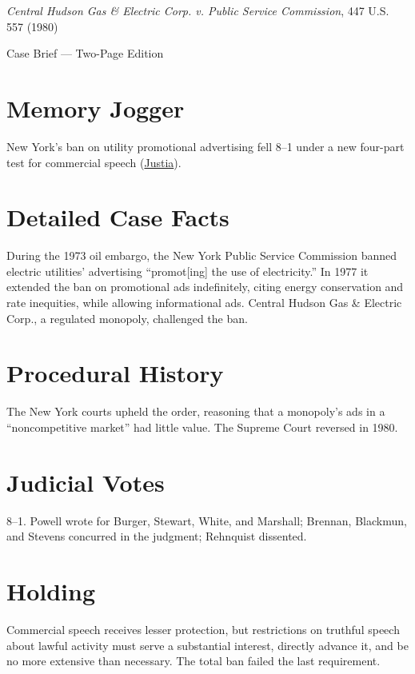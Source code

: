 \documentclass[12pt]{article}
\begin{document}
\begin{center}
{\LARGE \textit{Central Hudson Gas \& Electric Corp. v. Public Service Commission}, 447 U.S. 557 (1980)\par}
\vspace{0.5em}
{\large Case Brief --- Two-Page Edition\par}
\end{center}

\section{Memory Jogger}
New York's ban on utility promotional advertising fell 8--1 under a new four-part test for commercial speech (\href{https://supreme.justia.com/cases/federal/us/447/557/}{Justia}).

\section{Detailed Case Facts}
During the 1973 oil embargo, the New York Public Service Commission banned electric utilities' advertising ``promot[ing] the use of electricity.'' In 1977 it extended the ban on promotional ads indefinitely, citing energy conservation and rate inequities, while allowing informational ads. Central Hudson Gas \& Electric Corp., a regulated monopoly, challenged the ban.

\section{Procedural History}
The New York courts upheld the order, reasoning that a monopoly's ads in a ``noncompetitive market'' had little value. The Supreme Court reversed in 1980.

\section{Judicial Votes}
8--1. Powell wrote for Burger, Stewart, White, and Marshall; Brennan, Blackmun, and Stevens concurred in the judgment; Rehnquist dissented.

\section{Holding}
Commercial speech receives lesser protection, but restrictions on truthful speech about lawful activity must serve a substantial interest, directly advance it, and be no more extensive than necessary. The total ban failed the last requirement.
\end{document}

